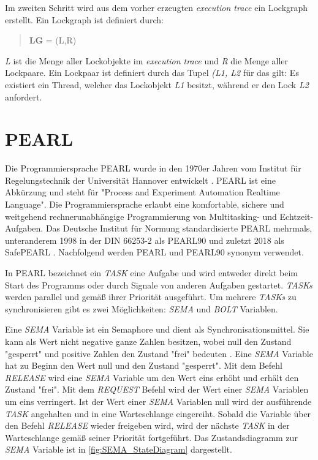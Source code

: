 Im zweiten Schritt wird aus dem vorher erzeugten \textit{execution trace} ein
Lockgraph erstellt. Ein Lockgraph ist definiert durch:
\begin{quote}
\textbf{LG} = (L,R)
\end{quote}
\textit{L} ist die Menge aller Lockobjekte im \textit{execution trace} und
\textit{R} die Menge aller Lockpaare. Ein Lockpaar ist definiert durch das Tupel
\textit{(L1, L2} für das gilt: Es existiert ein
Thread, welcher das Lockobjekt \textit{L1} besitzt, während er
den Lock \textit{L2} anfordert.

\section{PEARL}
\label{section:PEARL}
Die Programmiersprache PEARL wurde in den 1970er Jahren vom Institut für Regelungstechnik der Universität Hannover entwickelt \autocite{PEARLHistory}. PEARL ist eine Abkürzung und steht für "Process and Experiment Automation Realtime Language". Die Programmiersprache erlaubt eine komfortable, sichere und weitgehend rechnerunabhängige Programmierung von Multitasking- und Echtzeit-Aufgaben. Das Deutsche Institut für Normung standardisierte PEARL mehrmals, unteranderem 1998 in der DIN 66253-2 als PEARL90 \autocite{DIN-66253-2:1998-04} und zuletzt 2018 als SafePEARL \autocite{DIN-66253:2018-03}. Nachfolgend werden PEARL und PEARL90 synonym verwendet. 

In PEARL bezeichnet ein \textit{TASK} eine Aufgabe und wird entweder direkt beim Start des Programms oder durch Signale von anderen Aufgaben gestartet. \textit{TASKs} werden parallel und gemäß ihrer Priorität ausgeführt. Um mehrere \textit{TASKs} zu synchronisieren gibt es zwei Möglichkeiten: \textit{SEMA} und \textit{BOLT} Variablen. 

Eine \textit{SEMA} Variable ist ein Semaphore und dient als Synchronisationsmittel. Sie kann als Wert nicht negative ganze Zahlen besitzen, wobei null den Zustand "gesperrt" und positive Zahlen den Zustand "frei" bedeuten \autocite[9--17]{PEARL}. Eine \textit{SEMA} Variable hat zu Beginn den Wert null und den Zustand "gesperrt". Mit dem Befehl \textit{RELEASE} wird eine \textit{SEMA} Variable um den Wert eins erhöht und erhält den Zustand "frei". Mit dem \textit{REQUEST} Befehl wird der Wert einer \textit{SEMA} Variablen um eins verringert. Ist der Wert einer \textit{SEMA} Variablen null wird der ausführende \textit{TASK} angehalten und in eine Warteschlange eingereiht. Sobald die Variable über den Befehl \textit{RELEASE} wieder freigeben wird, wird der nächste \textit{TASK} in der Warteschlange gemäß seiner Priorität fortgeführt. Das Zustandsdiagramm zur \textit{SEMA} Variable ist in \cref{fig:SEMA_StateDiagram} dargestellt.


